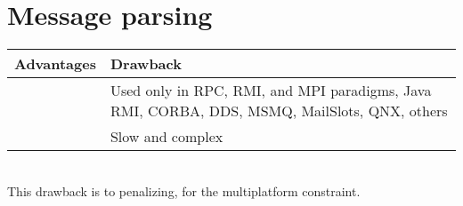 \section{Message parsing}

\begin{tabular}{|p{}||p{}|}
\hline
  \textbf{Advantages}&\textbf{Drawback}\\
\hline
&Used only in RPC, RMI, and MPI paradigms, Java RMI, CORBA, DDS, MSMQ, MailSlots, QNX, others\\
  \hline
                     &Slow and complex\\
  \hline
\end{tabular}
~\\

This drawback is to penalizing, for the multiplatform constraint.








